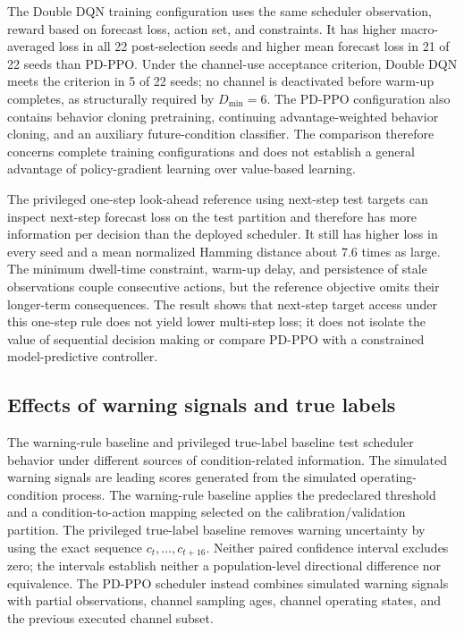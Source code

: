 The Double DQN training configuration uses the same scheduler observation,
reward based on forecast loss, action set, and constraints. It has higher
macro-averaged loss in all 22 post-selection seeds and higher
mean forecast loss in 21 of 22 seeds than PD-PPO. Under the channel-use
acceptance criterion, Double DQN meets the criterion in 5 of 22 seeds;
no channel is deactivated before warm-up completes, as structurally required by
$D_{\min}=6$. The PD-PPO configuration also
contains behavior cloning pretraining, continuing advantage-weighted behavior
cloning, and an auxiliary future-condition classifier. The comparison therefore
concerns complete training configurations and does not establish a general
advantage of policy-gradient learning over value-based learning.

The privileged one-step look-ahead reference using next-step test targets can
inspect next-step forecast loss on the test partition and therefore has more
information per decision than the deployed scheduler. It still has higher loss
in every seed and a mean normalized Hamming distance about 7.6 times as large.
The minimum dwell-time constraint, warm-up delay, and persistence of stale
observations couple consecutive actions, but the reference objective omits
their longer-term consequences. The result shows that next-step target access
under this one-step rule does not yield lower multi-step loss; it does not
isolate the value of sequential decision making or compare PD-PPO with a
constrained model-predictive controller.

\subsection{Effects of warning signals and true labels}

The warning-rule baseline and privileged true-label baseline test scheduler
behavior under different sources of condition-related information. The
simulated warning signals are leading scores generated from the simulated
operating-condition process. The warning-rule baseline applies the predeclared
threshold and a condition-to-action mapping selected on the
calibration/validation partition. The privileged true-label baseline removes
warning uncertainty by using the exact sequence $c_t,\ldots,c_{t+16}$. Neither
paired confidence interval excludes zero; the intervals establish neither a
population-level directional difference nor equivalence. The PD-PPO scheduler
instead combines simulated warning signals with partial observations, channel
sampling ages, channel operating states, and the previous executed channel
subset.

